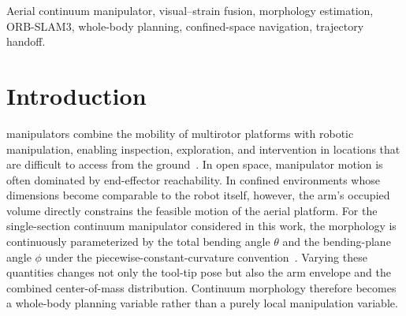 \documentclass[journal,twoside]{IEEEtran}
\begin{document}
\begin{abstract}
In 90 paired PX4/Gazebo closed-loop scenarios, the proposed Rolling-WB planner completes 89/90 tasks, corresponding to a 98.9\% success rate and a 23.3-percentage-point improvement over the best baseline. In hard scenarios, the success rate reaches 96.7\%, compared with 40.0\% for the best baseline. The planning-time P95 is 3.70~s with no planning deadline miss. A paired handoff ablation further shows a 72.8\% reduction in median translational jerk per unit path length relative to position-only switching. Staged visual-degradation tests additionally show that fusion weights migrate smoothly toward the strain branch when ORB observations deteriorate or fail.
\end{abstract}

\begin{IEEEkeywords}
Aerial continuum manipulator, visual--strain fusion, morphology estimation, ORB-SLAM3, whole-body planning, confined-space navigation, trajectory handoff.
\end{IEEEkeywords}

\section{Introduction}

 manipulators combine the mobility of multirotor platforms with robotic manipulation, enabling inspection, exploration, and intervention in locations that are difficult to access from the ground~\cite{ollero2022survey}. In open space, manipulator motion is often dominated by end-effector reachability. In confined environments whose dimensions become comparable to the robot itself, however, the arm's occupied volume directly constrains the feasible motion of the aerial platform. For the single-section continuum manipulator considered in this work, the morphology is continuously parameterized by the total bending angle $\theta$ and the bending-plane angle $\phi$ under the piecewise-constant-curvature convention~\cite{webster2010pcc}. Varying these quantities changes not only the tool-tip pose but also the arm envelope and the combined center-of-mass distribution. Continuum morphology therefore becomes a whole-body planning variable rather than a purely local manipulation variable.
\end{document}
